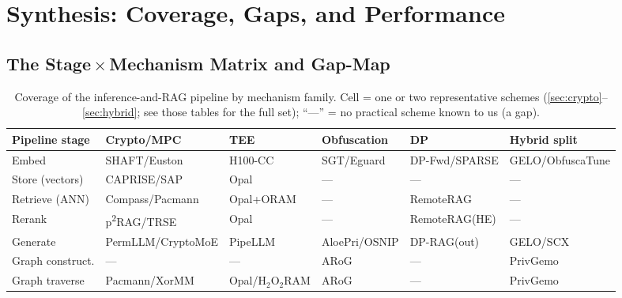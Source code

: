 \section{Synthesis: Coverage, Gaps, and Performance}
\label{sec:synthesis}


\subsection{The Stage\,$\times$\,Mechanism Matrix and Gap-Map}
\begin{table}[t]
  \centering \scriptsize
  \caption{Coverage of the inference-and-RAG pipeline by mechanism family. Cell = one
    or two representative schemes (\cref{sec:crypto}--\cref{sec:hybrid}; see those
    tables for the full set); ``---'' = no practical scheme known to us (a gap).}
  \label{tab:gapmap}
  \begin{tabular}{@{}llllll@{}}
    \toprule
    Pipeline stage & Crypto/MPC & TEE & Obfuscation & DP & Hybrid split \\
    \midrule
    Embed            & SHAFT/Euston       & H100-CC          & SGT/Eguard    & DP-Fwd/SPARSE & GELO/ObfuscaTune \\
    Store (vectors)  & CAPRISE/SAP        & Opal             & ---           & ---           & --- \\
    Retrieve (ANN)   & Compass/Pacmann    & Opal+ORAM        & ---           & RemoteRAG     & --- \\
    Rerank           & p\textsuperscript{2}RAG/TRSE & Opal   & ---           & RemoteRAG(HE) & --- \\
    Generate         & PermLLM/CryptoMoE  & PipeLLM          & AloePri/OSNIP & DP-RAG(out)   & GELO/SCX \\
    Graph construct. & ---                & ---              & ARoG          & ---           & PrivGemo \\
    Graph traverse   & Pacmann/XorMM      & Opal/H$_2$O$_2$RAM & ARoG        & ---           & PrivGemo \\
    \bottomrule
  \end{tabular}
\end{table}

